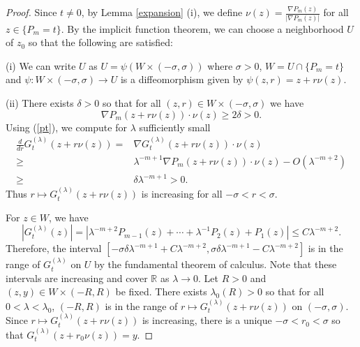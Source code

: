 \documentclass[10pt,a4paper]{amsart}
\newcommand{\R}{\mathbb{R}}
\begin{document}
\begin{proof}

Since $t\neq0$, by Lemma \ref{expansion} (i), we define $\nu(z)=\frac{\nabla P_m(z)}{|\nabla P_m(z)|}$ for all $z\in \{P_m=t\}$. By the implicit function theorem, we can choose a neighborhood $U$ of $z_0$ so that the following are satisfied:

(i) We can write $U$ as $U=\psi(W\times (-\sigma,\sigma))$ where $\sigma>0$, $W=U\cap\{P_m=t\}$ and $\psi:W\times (-\sigma,\sigma)\to U$ is a diffeomorphism given by $\psi(z,r)=z+r\nu(z)$.

(ii) There exists $\delta>0$ so that for all $(z,r)\in W\times (-\sigma,\sigma)$ we have \[\nabla P_m(z+r\nu(z))\cdot \nu(z)\ge 2\delta >0.\]
Using (\ref{pt}), we compute for $\lambda$ sufficiently small
\[
\begin{aligned}
	\frac{d}{dr}G_t^{(\lambda)}(z+r\nu(z))=&\nabla G_t^{(\lambda)}(z+r\nu(z))\cdot \nu(z)\\
	\ge&\lambda^{-m+1}\nabla P_m(z+r\nu(z))\cdot \nu(z)-O(\lambda^{-m+2})\\
	\ge&\delta \lambda^{-m+1}>0.
\end{aligned}
\]
Thus $r\mapsto G_t^{(\lambda)}(z+r\nu(z))$ is increasing for all $-\sigma<r<\sigma$.

For $z\in W$, we have \[|G_t^{(\lambda)}(z)|=|\lambda^{-m+2}P_{m-1}(z)+\cdots +\lambda^{-1}P_2(z)+P_1(z)|\le C\lambda^{-m+2}.\]
Therefore, the interval $[-\sigma \delta \lambda^{-m+1}+C\lambda^{-m+2},\sigma \delta \lambda^{-m+1}-C\lambda^{-m+2}]$ is in the range of $G_t^{(\lambda)}$ on $U$ by the fundamental theorem of calculus. Note that these intervals are increasing and cover $\R$ as $\lambda\to0$. Let $R>0$ and $(z,y)\in W\times (-R,R)$ be fixed.  There exists $\lambda_0(R)>0$ so that for all $0<\lambda<\lambda_0$, $(-R,R)$ is in the range of $r\mapsto G_t^{(\lambda)}(z+r\nu(z))$ on $(-\sigma,\sigma)$. Since $r\mapsto G_t^{(\lambda)}(z+r\nu(z))$ is increasing, there is a unique $-\sigma<r_0<\sigma$ so that $G_t^{(\lambda)}(z+r_0\nu(z))=y$.


\end{proof}
\end{document}
